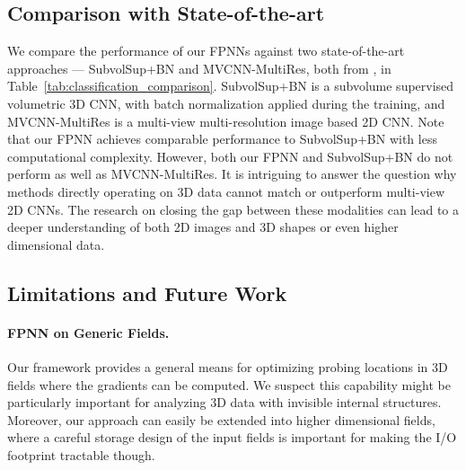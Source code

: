 \subsection{Comparison with State-of-the-art}
\begin{table}
	\vspace{-1.7cm}
	\begin{center}
	\end{center}
	\vspace{-0.3cm}
	\caption{Comparison with state-of-the-art methods.}
	\label{tab:classification_comparison}
	\vspace{-0.2cm}
\end{table}

We compare the performance of our FPNNs against two state-of-the-art approaches --- SubvolSup+BN and MVCNN-MultiRes, both from \cite{qi2016volumetric}, in Table~\ref{tab:classification_comparison}. SubvolSup+BN is a subvolume supervised volumetric 3D CNN, with batch normalization applied during the training, and MVCNN-MultiRes is a multi-view multi-resolution image based 2D CNN. Note that our FPNN achieves comparable performance to SubvolSup+BN with less computational complexity. However, both our FPNN and SubvolSup+BN do not perform as well as MVCNN-MultiRes. It is intriguing to answer the question why methods directly operating on 3D data cannot match or outperform multi-view 2D CNNs. The research on closing the gap between these modalities can lead to a deeper understanding of both 2D images and 3D shapes or even higher dimensional data.

\subsection{Limitations and Future Work}

\paragraph{FPNN on Generic Fields.}
Our framework provides a general means for optimizing probing locations in 3D fields where the gradients can be computed. We suspect this capability might be particularly important for analyzing 3D data with invisible internal structures. Moreover, our approach can easily be extended into higher dimensional fields, where a careful storage design of the input fields is important for making the I/O footprint tractable though.

